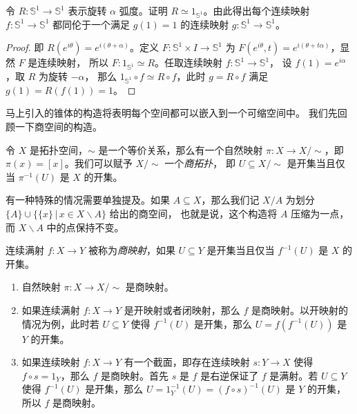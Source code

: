 \documentclass[fontset=none]{Notes}
\begin{document}
\begin{problem}{}{}
  令 $R:\mathbb{S}^1\to \mathbb{S}^1$ 表示旋转 $\alpha$ 弧度。证明
  $R\simeq 1_{\mathbb{S}^1}$。由此得出每个连续映射 $f:\mathbb{S}^1\to \mathbb{S}^1$
  都同伦于一个满足 $g(1)=1$ 的连续映射 $g:\mathbb{S}^1\to \mathbb{S}^1$。
\end{problem}
\begin{proof}
  即 $R(e^{i\theta})=e^{i(\theta+\alpha)}$。定义 $F:\mathbb{S}^1\times I\to \mathbb{S}^1$
  为 $F(e^{i\theta},t)=e^{i(\theta+t\alpha)}$，显然 $F$ 是连续映射，
  所以 $F:1_{\mathbb{S}^1}\simeq R$。任取连续映射 $f:\mathbb{S}^1\to \mathbb{S}^1$，
  设 $f(1)=e^{i\alpha}$，取 $R$ 为旋转 $-\alpha$，
  那么 $1_{\mathbb{S}^1}\circ f\simeq R\circ f$，此时 $g=R\circ f$
  满足 $g(1)=R(f(1))=1$。
\end{proof}

马上引入的锥体的构造将表明每个空间都可以嵌入到一个可缩空间中。
我们先回顾一下商空间的构造。

\begin{definition}
  令 $X$ 是拓扑空间，$\sim$ 是一个等价关系，那么有一个自然映射
  $\pi:X\to X/\sim$，即 $\pi(x)=[x]$。我们可以赋予 $X/\sim$ 一个\emph{商拓扑}，
  即 $U\subseteq X/\sim$ 是开集当且仅当 $\pi^{-1}(U)$ 是 $X$
  的开集。
\end{definition}

有一种特殊的情况需要单独提及。如果 $A\subseteq X$，那么我们记 $X/A$
为划分 $\{A\}\cup \{\{x\}\,|\, x\in X \smallsetminus A\}$ 给出的商空间，
也就是说，这个构造将 $A$ 压缩为一点，而 $X \smallsetminus A$ 中的点保持不变。

\begin{definition}
  连续满射 $f:X\to Y$ 被称为\emph{商映射}，如果 $U\subseteq Y$
  是开集当且仅当 $f^{-1}(U)$ 是 $X$ 的开集。
\end{definition}

\begin{example}
  \mbox{}
  \begin{enumerate}
    \item 自然映射 $\pi:X\to X/\sim$ 是商映射。
    \item 如果连续满射 $f:X\to Y$ 是开映射或者闭映射，那么 $f$
    是商映射。以开映射的情况为例，此时若 $U\subseteq Y$ 使得 $f^{-1}(U)$
    是开集，那么 $U=f(f^{-1}(U))$ 是 $Y$ 的开集。
    \item 如果连续映射 $f:X\to Y$ 有一个截面，即存在连续映射 $s:Y\to X$
    使得 $f\circ s=1_Y$，那么 $f$ 是商映射。首先 $s$ 是 $f$ 是右逆保证了
    $f$ 是满射。若 $U\subseteq Y$ 使得 $f^{-1}(U)$ 是开集，那么 
    $U=1_Y^{-1}(U)=(f\circ s)^{-1}(U)$ 是 $Y$ 的开集，所以 $f$
    是商映射。
  \end{enumerate}
\end{example}
\end{document}
